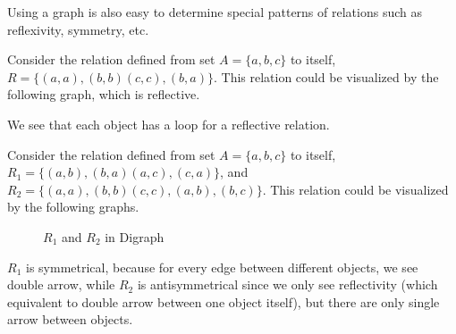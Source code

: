Using a graph is also easy to determine special patterns of relations such as reflexivity, symmetry, etc.
\begin{example}
	Consider the relation defined from set $A=\{a,b,c\}$ to itself, $R = \{(a,a),(b,b)(c,c),(b,a)\}$. This relation could be visualized by the following graph, which is reflective.
	\begin{center}
	\end{center}
	We see that each object has a loop for a reflective relation.
\end{example}
\begin{example}
	Consider the relation defined from set $A=\{a,b,c\}$ to itself, $R_1 = \{(a,b),(b,a)(a,c),(c,a)\}$, and $R_2=\{(a,a),(b,b)(c,c),(a,b),(b,c) \}$. This relation could be visualized by the following graphs.
	\begin{figure}[H]
		\centering
		\hspace{2cm}
	\caption{$R_1$ and $R_2$ in Digraph}
	\end{figure}
	$R_1$ is symmetrical, because for every edge between different objects, we see double arrow, while $R_2$ is antisymmetrical since we only see reflectivity (which equivalent to double arrow between one object itself), but there are only single arrow between objects.
\end{example}
	
